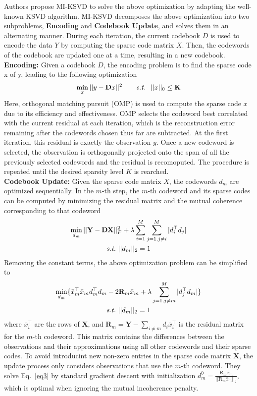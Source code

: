 \documentclass[10pt,twocolumn,letterpaper]{article}
\begin{document}
Authors propose MI-KSVD to solve the above optimization by adapting the well-known KSVD algorithm. MI-KSVD decomposes the above optimization into two subproblems, {\bf Encoding} and {\bf Codebook Update}, and solves them in an alternating manner. During each iteration, the current codebook $D$ is used to encode the data $Y$ by computing the sparse code matrix $X$. Then, the codewords of the codebook are updated one at a time, resulting in a new codebook.\\
{\bf Encoding:} Given a codebook $D$, the encoding problem is to find the sparse code x of y, leading to the following optimization~\cite{multipath}\\
\begin{gather}
\mathop{\min}\limits_{x}||y - \mathbf{D}x||^2~~~~~~\emph{s.t.}~~||x||_0\le\mathbf{K}
\end{gather}
Here, orthogonal matching pursuit (OMP) is used to compute the sparse code $x$ due to its efficiency and effectiveness. OMP selects the codeword best correlated with the current residual at each iteration, which is the reconstruction error remaining after the codewords chosen thus far are subtracted. At the first iteration, this residual is exactly the observation $y$. Once a new codeword is selected, the observation is orthogonally projected onto the span of all the previously selected codewords and the residual is recomoputed. The procedure is repeated until the desired sparsity level $K$ is rearched. \\
{\bf Codebook Update:} Given the sparse code matrix $X$, the codewords $d_m$ are optimized sequentially. In the $m$-th step, the $m$-th codeword and its sparse codes can be computed by minimizing the residual matrix and the mutual coherence corresponding to that codeword~\cite{multipath}\\
\begin{gather}
\mathop{\min}\limits_{d_m}||\mathbf{Y} - \mathbf{DX}||_{F}^2 + \lambda\sum_{i=1}^M\sum_{j=1,j\ne i}^M|d_i^{\top}d_j|\\
\emph{s.t.}~||d_m||_2 = 1 \notag
\end{gather}
Removing the constant terms, the above optimization problem can be simplified to~\cite{multipath} \\
\begin{gather}
\mathop{\min}\limits_{d_m}\{\bar{x}_m^\top\bar{x}_md_m^{\top} d_m - 2\mathbf{R}_m\bar{x}_m + \lambda\sum_{j=1,j\ne m}^M|d_j^\top d_m|\}\\
\emph{s.t.}~||d_m||_2 = 1 \notag
\label{eq3}
\end{gather}
where $\bar{x}_i^{\top}$ are the rows of $\mathbf{X}$, and $\mathbf{R}_m = \mathbf{Y} - \sum_{i\ne m}d_i\bar{x}_i^{\top}$ is the residual matrix for the $m$-th codeword. This matrix contains the differences between the observations and their approximations using all other codewords and their sparse codes. To avoid introducint new non-zero entries in the sparse code matrix $\mathbf{X}$, the update process only considers observations that use the $m$-th codeword. They solve Eq.~\ref{eq3} by standard gradient descent with initialization $d_m^0 = \frac{\mathbf{R}_m\bar{x}_m}{||\mathbf{R}_m\bar{x}_m||_2}$, which is optimal when ignoring the mutual incoherence penalty.
\end{document}
